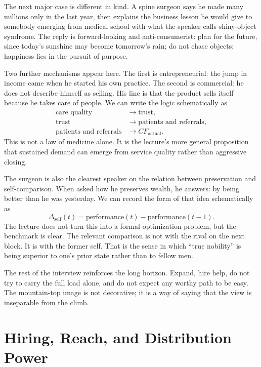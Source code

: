 The next major case is different in kind. A spine surgeon says he made many millions only in the last year, then explains the business lesson he would give to somebody emerging from medical school with what the speaker calls shiny-object syndrome. The reply is forward-looking and anti-consumerist: plan for the future, since today's sunshine may become tomorrow's rain; do not chase objects; happiness lies in the pursuit of purpose.

Two further mechanisms appear here. The first is entrepreneurial: the jump in income came when he started his own practice. The second is commercial: he does not describe himself as selling. His line is that the product sells itself because he takes care of people. We can write the logic schematically as
\begin{align}
\text{care quality} &\longrightarrow \text{trust}, \\
\text{trust} &\longrightarrow \text{patients and referrals}, \\
\text{patients and referrals} &\longrightarrow CF_{\text{actual}}.
\end{align}
This is not a law of medicine alone. It is the lecture's more general proposition that sustained demand can emerge from service quality rather than aggressive closing.

The surgeon is also the clearest speaker on the relation between preservation and self-comparison. When asked how he preserves wealth, he answers: by being better than he was yesterday. We can record the form of that idea schematically as
\begin{equation}
\Delta_{\text{self}}(t) = \text{performance}(t) - \text{performance}(t-1).
\end{equation}
The lecture does not turn this into a formal optimization problem, but the benchmark is clear. The relevant comparison is not with the rival on the next block. It is with the former self. That is the sense in which ``true nobility'' is being superior to one's prior state rather than to fellow men.

The rest of the interview reinforces the long horizon. Expand, hire help, do not try to carry the full load alone, and do not expect any worthy path to be easy. The mountain-top image is not decorative; it is a way of saying that the view is inseparable from the climb.

\section{Hiring, Reach, and Distribution Power}

